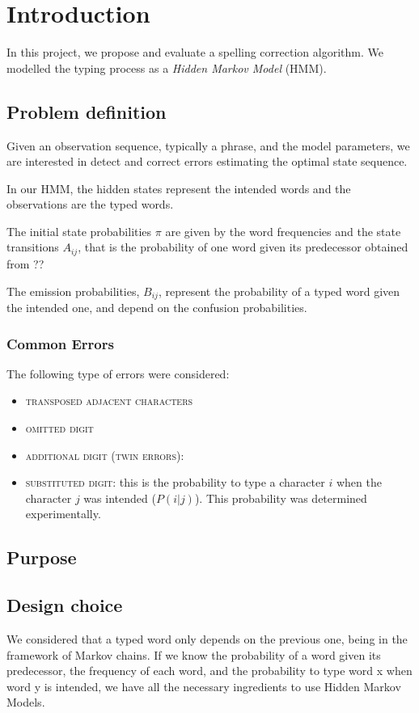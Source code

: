 \chapter{Introduction}
\label{chap:Introduction}

In this project, we propose and evaluate a spelling correction algorithm. 
We modelled the typing process as a \textit{Hidden Markov Model} (HMM). 






\section{Problem definition}
Given an observation sequence, typically a phrase,  and the model 
parameters, we are interested in detect and correct errors estimating the 
optimal state sequence. %

In our HMM, the hidden states represent the intended words and the 
observations are the typed words. 

The initial state probabilities $\pi$ are given by the word frequencies and 
the state transitions $A_{ij}$, that is the probability of one word given 
its predecessor obtained from ?? %

The emission probabilities, $B_{ij}$, represent the probability of a typed 
word given the intended one, and depend on the confusion probabilities.

\subsection{Common Errors}
The following type of errors were considered:
\begin{itemize}
	\item \textsc{transposed adjacent characters}
	\item \textsc{omitted digit}
	\item \textsc{additional digit (twin errors)}:
	\item \textsc{substituted digit}: this is the probability to type a
	character $i$ when the character $j$ was intended ($P(i|j)$). This 
	probability was determined experimentally. %
\end{itemize}


\section{Purpose}

\section{Design choice}
We considered that a typed word only depends on the previous one, being 
in the framework of Markov chains. If we know the probability of a word 
given its predecessor, the frequency of each word, and the probability to 
type word x when word y is intended, we have all the necessary ingredients 
to use Hidden Markov Models.

